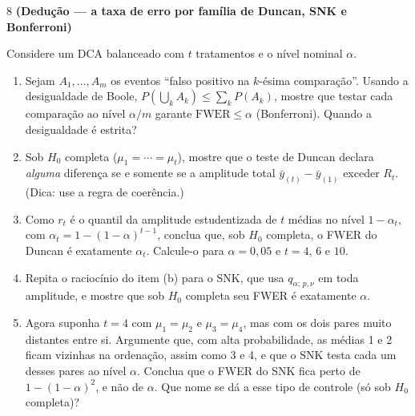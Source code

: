 \documentclass[11pt]{article}
\begin{document}
\begin{questao}{8} \textbf{(Dedução --- a taxa de erro por família de Duncan, SNK e Bonferroni)}

Considere um DCA balanceado com $t$ tratamentos e o nível nominal $\alpha$.

\begin{enumerate}[label=(\alph*)]
  \item Sejam $A_1, \ldots, A_m$ os eventos ``falso positivo na $k$-ésima comparação''. Usando a
    desigualdade de Boole, $P(\bigcup_k A_k) \le \sum_k P(A_k)$, mostre que testar cada comparação
    ao nível $\alpha/m$ garante $\text{FWER} \le \alpha$ (Bonferroni). Quando a desigualdade é estrita?
  \item Sob $H_0$ completa ($\mu_1 = \cdots = \mu_t$), mostre que o teste de Duncan declara
    \emph{alguma} diferença se e somente se a amplitude total $\bar y_{(t)} - \bar y_{(1)}$ exceder
    $R_t$. (Dica: use a regra de coerência.)
  \item Como $r_t$ é o quantil da amplitude estudentizada de $t$ médias no nível
    $1 - \alpha_t$, com $\alpha_t = 1-(1-\alpha)^{t-1}$, conclua que, sob $H_0$ completa, o FWER do
    Duncan é exatamente $\alpha_t$. Calcule-o para $\alpha = 0{,}05$ e $t = 4$, $6$ e $10$.
  \item Repita o raciocínio do item (b) para o SNK, que usa $q_{\alpha;\,p,\nu}$ em toda amplitude, e
    mostre que sob $H_0$ completa seu FWER é exatamente $\alpha$.
  \item Agora suponha $t = 4$ com $\mu_1 = \mu_2$ e $\mu_3 = \mu_4$, mas com os dois pares muito
    distantes entre si. Argumente que, com alta probabilidade, as médias 1 e 2 ficam vizinhas na
    ordenação, assim como 3 e 4, e que o SNK testa cada um desses pares ao nível $\alpha$. Conclua
    que o FWER do SNK fica perto de $1-(1-\alpha)^2$, e não de $\alpha$. Que nome se dá a esse tipo de
    controle (só sob $H_0$ completa)?
\end{enumerate}
\end{questao}
\end{document}
